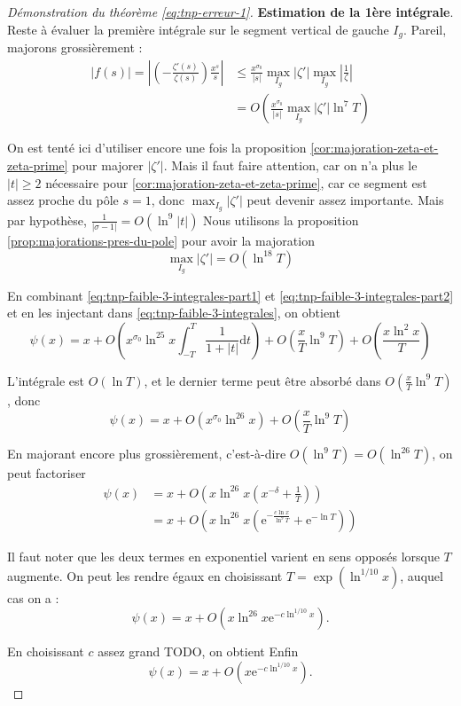 \documentclass[french]{report}
\begin{document}
\begin{proof}[Démonstration du théorème \ref{eq:tnp-erreur-1}]
  \textbf{Estimation de la 1ère intégrale}. Reste à évaluer la première intégrale sur le segment vertical de gauche $I_g$. Pareil, majorons grossièrement :
  \begin{align*}
    |f(s)| = \left|\left(-\frac{\zeta'(s)}{\zeta(s)}\right)\frac{x^s}{s}\right| & \leq\frac{x^{\sigma_0}}{|s|}\max_{I_g}|\zeta'|\max_{I_g}\left|\frac{1}{\zeta}\right| \\
    & = O\left(\frac{x^{\sigma_0}}{|s|}\max_{I_g}|\zeta'|\ln^7 T\right)
  \end{align*}

  On est tenté ici d'utiliser encore une fois la proposition \ref{cor:majoration-zeta-et-zeta-prime} pour majorer $|\zeta'|$. Mais il faut faire attention, car on n'a plus le $|t|\geq2$ nécessaire pour \ref{cor:majoration-zeta-et-zeta-prime}, car ce segment est assez proche du pôle $s=1$, donc $\max_{I_g}|\zeta'|$ peut devenir assez importante. Mais par hypothèse, $\frac{1}{|\sigma-1|}=O(\ln^9|t|)$ Nous utilisons la proposition \ref{prop:majorations-pres-du-pole} pour avoir la majoration
  \begin{equation}\label{eq:tnp-faible-3-integrales-part2}
    \max_{I_g}|\zeta'|=O(\ln^{18}T)
  \end{equation}

  En combinant \ref{eq:tnp-faible-3-integrales-part1} et \ref{eq:tnp-faible-3-integrales-part2} et en les injectant dans \ref{eq:tnp-faible-3-integrales}, on obtient
  \[ \psi(x) = x
  + O\left(x^{\sigma_0}\ln^{25}x\int_{-T}^T\frac{1}{1+|t|}\mathrm{d}t\right)
  + O\left(\frac{x}{T}\ln^9T\right)
  + O\left(\frac{x\ln^2x}{T}\right)
  \]

  L'intégrale est $O(\ln T)$, et le dernier terme peut être absorbé dans $O\left(\frac{x}{T}\ln^9T\right)$, donc
  \[ \psi(x) = x + O(x^{\sigma_0}\ln^{26}x) + O\left(\frac{x}{T}\ln^9T\right) \]

  En majorant encore plus grossièrement, c'est-à-dire $O(\ln^9 T) = O(\ln^26 T)$, on peut factoriser
  \begin{align*}
    \psi(x) &= x + O\left(x\ln^{26} x\left(x^{-\delta}+\frac{1}{T}\right)\right) \\
    &= x + O\left(x\ln^{26} x\left(\mathrm{e}^{-\frac{c\ln x}{\ln^9 T}}+\mathrm{e}^{-\ln T}\right)\right)
  \end{align*}

  Il faut noter que les deux termes en exponentiel varient en sens opposés lorsque $T$ augmente. On peut les rendre égaux en choisissant $T=\exp(\ln^{1/10}x)$, auquel cas on a :
  \[ \psi(x) = x + O(x\ln^{26} x\mathrm{e}^{-c\ln^{1/10}x}). \]

  En choisissant $c$ assez grand TODO, on obtient Enfin
  \[ \psi(x) = x + O(x\mathrm{e}^{-c\ln^{1/10}x}). \]
\end{proof}
\end{document}
